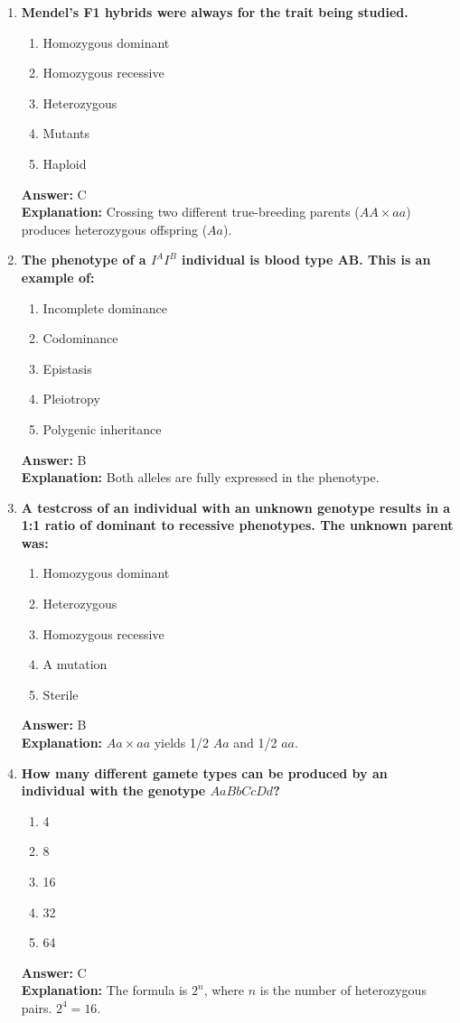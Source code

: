 \documentclass[11pt, a4paper]{article}
\begin{document}
\begin{enumerate}[leftmargin=*, label=\arabic*.]
\item \textbf{Mendel’s F1 hybrids were always \underline{\hspace{1cm}} for the trait being studied.}
\begin{enumerate}[label=\Alph*.]
\item Homozygous dominant
\item Homozygous recessive
\item Heterozygous
\item Mutants
\item Haploid
\end{enumerate}
\textbf{Answer:} C \\
\textbf{Explanation:} Crossing two different true-breeding parents ($AA \times aa$) produces heterozygous offspring ($Aa$).

\item \textbf{The phenotype of a $I^A I^B$ individual is blood type AB. This is an example of:}
\begin{enumerate}[label=\Alph*.]
\item Incomplete dominance
\item Codominance
\item Epistasis
\item Pleiotropy
\item Polygenic inheritance
\end{enumerate}
\textbf{Answer:} B \\
\textbf{Explanation:} Both alleles are fully expressed in the phenotype.

\item \textbf{A testcross of an individual with an unknown genotype results in a 1:1 ratio of dominant to recessive phenotypes. The unknown parent was:}
\begin{enumerate}[label=\Alph*.]
\item Homozygous dominant
\item Heterozygous
\item Homozygous recessive
\item A mutation
\item Sterile
\end{enumerate}
\textbf{Answer:} B \\
\textbf{Explanation:} $Aa \times aa$ yields 1/2 $Aa$ and 1/2 $aa$.

\item \textbf{How many different gamete types can be produced by an individual with the genotype $AaBbCcDd$?}
\begin{enumerate}[label=\Alph*.]
\item 4
\item 8
\item 16
\item 32
\item 64
\end{enumerate}
\textbf{Answer:} C \\
\textbf{Explanation:} The formula is $2^n$, where $n$ is the number of heterozygous pairs. $2^4 = 16$.


\end{enumerate}
\end{document}
